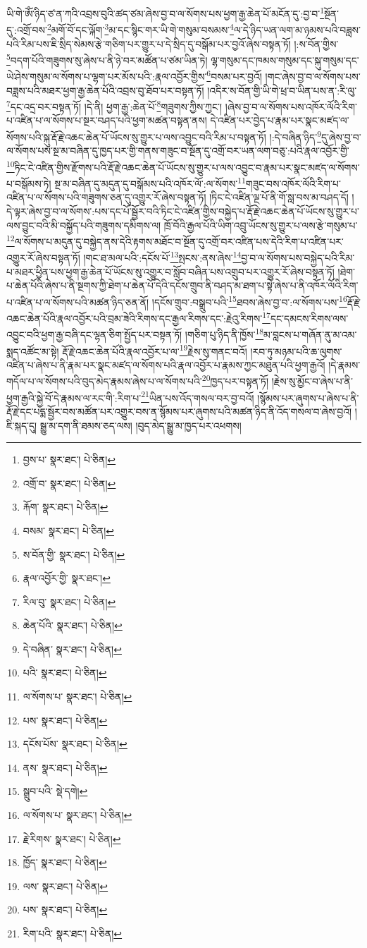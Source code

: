 ཡི་གེ་ཨོཾ་ཉིད་ཙ་ན་ཀའི་འབྲས་བུའི་ཚད་ཙམ་ཞེས་བྱ་བ་ལ་སོགས་པས་ཕྱག་རྒྱ་ཆེན་པོ་མངོན་དུ་:བྱ་བ་\footnote{བྱས་པ་  སྣར་ཐང་།  པེ་ཅིན། }སྔོན་དུ་:འགྲོ་བས་\footnote{འགྲོ་བ་  སྣར་ཐང་།  པེ་ཅིན། }མགོ་བོ་དང་ལྐོག་\footnote{རྐོག་  སྣར་ཐང་།  པེ་ཅིན། }མ་དང་སྙིང་གར་ཡི་གེ་གསུམ་བསམས་\footnote{བསམ་  སྣར་ཐང་།  པེ་ཅིན། }ལ་དེ་ཉིད་ཡན་ལག་མ་ཉམས་པའི་བཟླས་པའི་རིམ་པས་ཇི་སྲིད་སེམས་རྩེ་གཅིག་པར་གྱུར་པ་དེ་སྲིད་དུ་བསྒོམ་པར་བྱའོ་ཞེས་བསྟན་ཏོ། །:ས་བོན་གྱིས་\footnote{ས་བོན་གྱི་  སྣར་ཐང་།  པེ་ཅིན། }བདག་པོའི་གཟུགས་སུ་ཞེས་པ་ནི་ཉེ་བར་མཚོན་པ་ཙམ་ཡིན་ཏེ། ལྷ་གསུམ་དང་ཁམས་གསུམ་དང་སྐུ་གསུམ་དང་ཡེ་ཤེས་གསུམ་ལ་སོགས་པ་ལྷག་པར་མོས་པའི་:རྣལ་འབྱོར་གྱིས་\footnote{རྣལ་འབྱོར་གྱི་  སྣར་ཐང་། }བསམ་པར་བྱའོ། །གང་ཞེས་བྱ་བ་ལ་སོགས་པས་བཟླས་པའི་མཐར་ཕྱག་རྒྱ་ཆེན་པོའི་འབྲས་བུ་ཐོབ་པར་བསྟན་ཏོ། །འདིར་ས་བོན་གྱི་ཡི་གེ་ཕྲ་བ་ཡིན་པས་ན་:རི་ལུ་\footnote{རིལ་བུ་  སྣར་ཐང་།  པེ་ཅིན། }དང་འདྲ་བར་བསྟན་ཏོ། །དེ་ནི། ཕྱག་རྒྱ་:ཆེན་པོ་\footnote{ཆེན་པོའི་  སྣར་ཐང་།  པེ་ཅིན། }གཟུགས་ཀྱིས་ཀྱང་། །ཞེས་བྱ་བ་ལ་སོགས་པས་འཁོར་ལོའི་རིག་པ་འཛིན་པ་ལ་སོགས་པ་སྔར་བཤད་པའི་ཕྱག་མཚན་བསྟན་ནས། དེ་འཛིན་པར་བྱེད་པ་རྣམ་པར་སྣང་མཛད་ལ་སོགས་པའི་སྐུ་རྡོ་རྗེ་འཆང་ཆེན་པོ་ཡོངས་སུ་གྱུར་པ་ལས་འབྱུང་བའི་རིམ་པ་བསྟན་ཏོ། །:དེ་བཞིན་ཉིད་\footnote{དེ་བཞིན་  སྣར་ཐང་།  པེ་ཅིན། }དུ་ཞེས་བྱ་བ་ལ་སོགས་པས་སྔ་མ་བཞིན་དུ་ཁྱད་པར་གྱི་གནས་གཟུང་བ་སྔོན་དུ་འགྲོ་བར་ཡན་ལག་བཅུ་:པའི་རྣལ་འབྱོར་གྱི་\footnote{པའི་  སྣར་ཐང་།  པེ་ཅིན། }ཏིང་ངེ་འཛིན་གྱིས་རྫོགས་པའི་རྡོ་རྗེ་འཆང་ཆེན་པོ་ཡོངས་སུ་གྱུར་པ་ལས་འབྱུང་བ་རྣམ་པར་སྣང་མཛད་ལ་སོགས་པ་བསྒོམས་ཏེ། སྔ་མ་བཞིན་དུ་མདུན་དུ་བསྒོམས་པའི་འཁོར་ལོ་:ལ་སོགས་\footnote{ལ་སོགས་པ་  སྣར་ཐང་།  པེ་ཅིན། }གཟུང་བས་འཁོར་ལོའི་རིག་པ་འཛིན་པ་ལ་སོགས་པའི་གཟུགས་ཅན་དུ་འགྱུར་རོ་ཞེས་བསྟན་ཏོ། །ཏིང་ངེ་འཛིན་ལྔ་པོ་ནི་གོ་སླ་བས་མ་བཤད་དོ། །དེ་ལྟར་ཞེས་བྱ་བ་ལ་སོགས་:པས་དང་པོ་སྦྱོར་བའི་ཏིང་ངེ་འཛིན་གྱིས་བསྐྱེད་པ་རྡོ་རྗེ་འཆང་ཆེན་པོ་ཡོངས་སུ་གྱུར་པ་ལས་བྱུང་བའི་མི་བསྐྱོད་པའི་གཟུགས་དམིགས་ལ། ཁྲོ་བོའི་རྒྱལ་པོའི་ཡིག་འབྲུ་ཡོངས་སུ་གྱུར་པ་ལས་རྩེ་གསུམ་པ་\footnote{པས་  སྣར་ཐང་།  པེ་ཅིན། }ལ་སོགས་པ་མདུན་དུ་བསྐྱེད་ནས་དེའི་རྟགས་མཐོང་བ་སྔོན་དུ་འགྲོ་བར་འཛིན་པས་དེའི་རིག་པ་འཛིན་པར་འགྱུར་རོ་ཞེས་བསྟན་ཏོ། །གང་ཐ་མལ་པའི་:དངོས་པོ་\footnote{དངོས་པོས་  སྣར་ཐང་།  པེ་ཅིན། }སྤངས་:ནས་ཞེས་\footnote{ནས་  སྣར་ཐང་།  པེ་ཅིན། }བྱ་བ་ལ་སོགས་པས་བསྐྱེད་པའི་རིམ་པ་མཐར་ཕྱིན་པས་ཕྱག་རྒྱ་ཆེན་པོ་ཡོངས་སུ་འགྱུར་བ་སློབ་བཞིན་པས་འགྲུབ་པར་འགྱུར་རོ་ཞེས་བསྟན་ཏོ། །ཐེག་པ་ཆེན་པོའི་ཞེས་པ་ནི་སྔགས་ཀྱི་ཐེག་པ་ཆེན་པོ་དེའི་དངོས་གྲུབ་ནི་བཤད་མ་ཐག་པ་སྟེ་ཞེས་པ་ནི་འཁོར་ལོའི་རིག་པ་འཛིན་པ་ལ་སོགས་པའི་མཚན་ཉིད་ཅན་ནོ། །དངོས་གྲུབ་:བསྒྲུབ་པའི་\footnote{སྒྲུབ་པའི་  སྡེ་དགེ། }ཐབས་ཞེས་བྱ་བ་:ལ་སོགས་པས་\footnote{ལ་སོགས་པ་  སྣར་ཐང་།  པེ་ཅིན། }རྡོ་རྗེ་འཆང་ཆེན་པོའི་རྣལ་འབྱོར་པའི་བྲམ་ཟེའི་རིགས་དང་རྒྱལ་རིགས་དང་:རྗེའུ་རིགས་\footnote{རྗེ་རིགས་  སྣར་ཐང་།  པེ་ཅིན། }དང་དམངས་རིགས་ལས་འབྱུང་བའི་ཕྱག་རྒྱ་བཞི་དང་ལྷན་ཅིག་སྤྱོད་པར་བསྟན་ཏོ། །གཅིག་པུ་ཉིད་ནི་ཁྱོས་\footnote{ཁྱོད་  སྣར་ཐང་།  པེ་ཅིན། }མ་བླངས་པ་གཞོན་ནུ་མ་འམ་སྨད་འཚོང་མ་སྟེ། རྡོ་རྗེ་འཆང་ཆེན་པོའི་རྣལ་འབྱོར་པ་ལ་\footnote{ལས་  སྣར་ཐང་།  པེ་ཅིན། }རྗེས་སུ་གནང་བའོ། །རབ་ཏུ་མཉམ་པའི་ཆ་ལུགས་འཛིན་པ་ཞེས་པ་ནི་རྣམ་པར་སྣང་མཛད་ལ་སོགས་པའི་རྣལ་འབྱོར་པ་རྣམས་ཀྱང་མཐུན་པའི་ཕྱག་རྒྱའོ། །དེ་རྣམས་གདོལ་པ་ལ་སོགས་པའི་བུད་མེད་རྣམས་ཞེས་པ་ལ་སོགས་པའི་\footnote{པས་  སྣར་ཐང་།  པེ་ཅིན། }ཁྱད་པར་བསྟན་ཏོ། །རྗེས་སུ་མྱོང་བ་ཞེས་པ་ནི་ཕྱག་རྒྱའི་སྐྱེ་བོ་དེ་རྣམས་ལ་རང་གི་:རིག་པ་\footnote{རིག་པའི་  སྣར་ཐང་།  པེ་ཅིན། }ཡིན་པས་འོད་གསལ་བར་བྱ་བའོ། །སྙོམས་པར་ཞུགས་པ་ཞེས་པ་ནི་རྡོ་རྗེ་དང་པདྨ་སྦྱོར་བས་མཚོན་པར་འགྱུར་བས་ན་སྙོམས་པར་ཞུགས་པའི་མཚན་ཉིད་ནི་འོད་གསལ་བ་ཞེས་བྱའོ། །ཇི་སྐད་དུ། སྒྱུ་མ་དག་ནི་ཐམས་ཅད་ལས། །བུད་མེད་སྒྱུ་མ་ཁྱད་པར་འཕགས། 